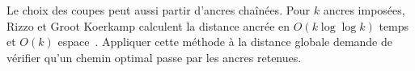 Le choix des coupes peut aussi partir d’ancres chaînées. Pour \(k\) ancres imposées, Rizzo et Groot Koerkamp calculent la distance ancrée en \(O(k\log\log k)\) temps et \(O(k)\) espace~\cite{llchain}. Appliquer cette méthode à la distance globale demande de vérifier qu’un chemin optimal passe par les ancres retenues.

